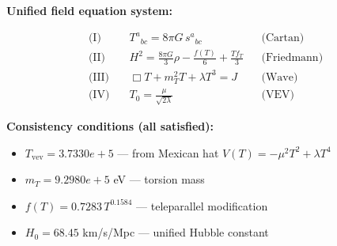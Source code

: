 
\textbf{Unified field equation system:}

\begin{align}
  \text{(I)} \quad & T^a{}_{bc} = 8\pi G \, s^a{}_{bc} && \text{(Cartan)} \\
  \text{(II)} \quad & H^2 = \frac{8\pi G}{3}\rho - \frac{f(T)}{6} + \frac{Tf_T}{3} && \text{(Friedmann)} \\
  \text{(III)} \quad & \Box T + m_T^2 T + \lambda T^3 = J && \text{(Wave)} \\
  \text{(IV)} \quad & T_0 = \frac{\mu}{\sqrt{2\lambda}} && \text{(VEV)}
\end{align}

\textbf{Consistency conditions (all satisfied):}
\begin{itemize}
  \item $T_{\text{vev}} = 3.7330e+5$ — from Mexican hat $V(T) = -\mu^2 T^2 + \lambda T^4$
  \item $m_T = 9.2980e+5$ eV — torsion mass
  \item $f(T) = 0.7283 \, T^{0.1584}$ — teleparallel modification
  \item $H_0 = 68.45$ km/s/Mpc — unified Hubble constant
\end{itemize}